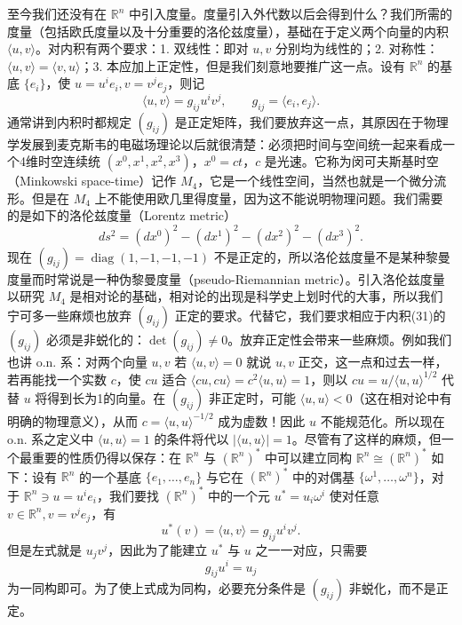 至今我们还没有在 $\mathbb R^n$ 中引入度量。度量引入外代数以后会得到什么？我们所需的度量（包括欧氏度量以及十分重要的洛伦兹度量），基础在于定义两个向量的内积 $\langle u,v\rangle$。对内积有两个要求：1. 双线性：即对 $u,v$ 分别均为线性的；2. 对称性：$\langle u,v\rangle=\langle v,u\rangle$；3. 本应加上正定性，但是我们刻意地要推广这一点。设有 $\mathbb R^n$ 的基底 $\{e_i\}$，使 $u=u^ie_i,v=v^je_j$，则记
\begin{equation}
 \langle u,v\rangle=g_{ij}u^iv^j,
 \qquad g_{ij}=\langle e_i,e_j\rangle.
 \tag{31}
\end{equation}
通常讲到内积时都规定 $(g_{ij})$ 是正定矩阵，我们要放弃这一点，其原因在于物理学发展到麦克斯韦的电磁场理论以后就很清楚：必须把时间与空间统一起来看成一个4维时空连续统 $(x^0,x^1,x^2,x^3)$，$x^0=ct$，$c$ 是光速。它称为闵可夫斯基时空（Minkowski space-time）记作 $M_4$，它是一个线性空间，当然也就是一个微分流形。但是在 $M_4$ 上不能使用欧几里得度量，因为这不能说明物理问题。我们需要的是如下的洛伦兹度量（Lorentz metric）
\begin{equation}
 ds^2=(dx^0)^2-(dx^1)^2-(dx^2)^2-(dx^3)^2.
 \tag{32}
\end{equation}
现在 $(g_{ij})=\operatorname{diag}(1,-1,-1,-1)$ 不是正定的，所以洛伦兹度量不是某种黎曼度量而时常说是一种伪黎曼度量（pseudo-Riemannian metric）。引入洛伦兹度量以研究 $M_4$ 是相对论的基础，相对论的出现是科学史上划时代的大事，所以我们宁可多一些麻烦也放弃 $(g_{ij})$ 正定的要求。代替它，我们要求相应于内积(31)的 $(g_{ij})$ 必须是非蜕化的：$\det(g_{ij})\ne0$。放弃正定性会带来一些麻烦。例如我们也讲 o.n. 系：对两个向量 $u,v$ 若 $\langle u,v\rangle=0$ 就说 $u,v$ 正交，这一点和过去一样，若再能找一个实数 $c$，使 $cu$ 适合 $\langle cu,cu\rangle=c^2\langle u,u\rangle=1$，则以 $cu=u/\langle u,u\rangle^{1/2}$ 代替 $u$ 将得到长为1的向量。在 $(g_{ij})$ 非正定时，可能 $\langle u,u\rangle<0$（这在相对论中有明确的物理意义），从而 $c=\langle u,u\rangle^{-1/2}$ 成为虚数！因此 $u$ 不能规范化。所以现在 o.n. 系之定义中 $\langle u,u\rangle=1$ 的条件将代以 $|\langle u,u\rangle|=1$。尽管有了这样的麻烦，但一个最重要的性质仍得以保存：在 $\mathbb R^n$ 与 $(\mathbb R^n)^*$ 中可以建立同构 $\mathbb R^n\cong(\mathbb R^n)^*$ 如下：设有 $\mathbb R^n$ 的一个基底 $\{e_1,\ldots,e_n\}$ 与它在 $(\mathbb R^n)^*$ 中的对偶基 $\{\omega^1,\ldots,\omega^n\}$，对于 $\mathbb R^n\ni u=u^ie_i$，我们要找 $(\mathbb R^n)^*$ 中的一个元 $u^*=u_i\omega^i$ 使对任意 $v\in\mathbb R^n,v=v^je_j$，有
\[
 u^*(v)=\langle u,v\rangle=g_{ij}u^iv^j.
\]
但是左式就是 $u_jv^j$，因此为了能建立 $u^*$ 与 $u$ 之一一对应，只需要
\[
 g_{ij}u^i=u_j
\]
为一同构即可。为了使上式成为同构，必要充分条件是 $(g_{ij})$ 非蜕化，而不是正定。

